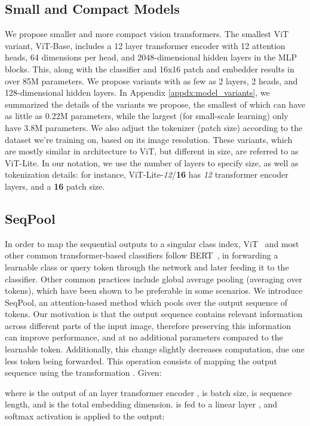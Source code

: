 \documentclass[10pt,twocolumn,letterpaper]{article}
\begin{document}
\subsection{Small and Compact Models}
\label{sec:method-small}
We propose smaller and more compact vision transformers. The smallest ViT variant, ViT-Base, includes a 12 layer transformer encoder with 12 attention heads, 64 dimensions per head, and 2048-dimensional hidden layers in the MLP blocks. This, along with the classifier and 16x16 patch and embedder results in over 85M parameters. We propose variants with as few as 2 layers, 2 heads, and 128-dimensional hidden layers. In Appendix \ref{appdx:model_variants}, we summarized the details of the variants we propose, the smallest of which can have as little as 0.22M parameters, while the largest (for small-scale learning) only have 3.8M parameters. We also adjust the tokenizer (patch size) according to the dataset we're training on, based on its image resolution. These variants, which are mostly similar in architecture to ViT, but different in size, are referred to as ViT-Lite.
In our notation, we use the number of layers to specify size, as well as tokenization details: for instance, ViT-Lite-\textit{12}/\textbf{16} has \textit{12} transformer encoder layers, and a \textbf{16} patch size.

\subsection{SeqPool}
\label{sec:seqpool}
In order to map the sequential outputs to a singular class index, ViT~\cite{dosovitskiy2020image} and most other common transformer-based classifiers follow BERT~\cite{devlin2019bert}, in forwarding a learnable class or query token through the network and later feeding it to the classifier. Other common practices include global average pooling (averaging over tokens), which have been shown to be preferable in some scenarios.
We introduce SeqPool, an attention-based method which pools over the output sequence of tokens.
Our motivation is that the output sequence contains relevant information across different parts of the input image, therefore preserving this information can improve performance, and at no additional parameters compared to the learnable token. Additionally, this change slightly decreases computation, due one less token being forwarded.
This operation consists of mapping the output sequence using the transformation . Given:

where  is the output of an  layer transformer encoder ,  is batch size,  is sequence length, and  is the total embedding dimension.  is fed to a linear layer , and softmax activation is applied to the output:
\end{document}
